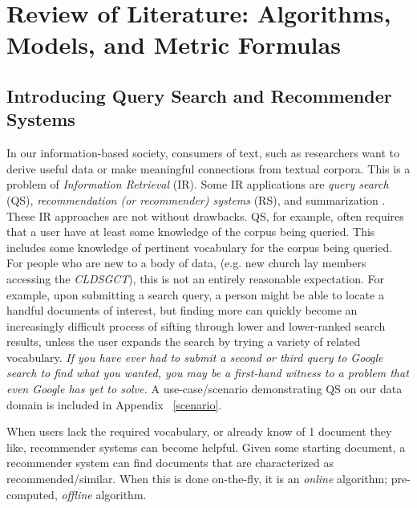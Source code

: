 \chapter{Review of Literature: Algorithms, Models, and Metric Formulas} \label{chp:review-of-literature}


\section{Introducing Query Search and Recommender Systems}
In our information-based society, consumers of text, such as researchers want to derive useful data or make meaningful connections from textual corpora. This is a problem of \textit{Information Retrieval} (IR). Some IR applications are \textit{query search} (QS), \textit{recommendation (or recommender) systems} (RS), and summarization \citep{Mani01summarizationevaluation:2001}.
These IR approaches are not without drawbacks. QS, for example, often requires that a user have at least some knowledge of the corpus being queried. This includes some knowledge of pertinent vocabulary for the corpus being queried. For people who are new to a body of data, (e.g. new church lay members accessing the \textit{CLDSGCT}), this is not an entirely reasonable expectation. For example, upon submitting a search query, a person might be able to locate a handful documents of interest, but finding more can quickly become an increasingly difficult process of sifting through lower and lower-ranked search results, unless the user expands the search by trying a variety of related vocabulary. \textit{If you have ever had to submit a second or third query to Google search to find what you wanted, you may be a first-hand witness to a problem that even Google has yet to solve.} A use-case/scenario demonstrating QS on our data domain is included in Appendix ~\ref{scenario}. %

When users lack the required vocabulary, or already know of 1 document they like, recommender systems can become helpful. Given some starting document, a recommender system can find documents that are characterized as recommended/similar. When this is done on-the-fly, it is an \textit{online} algorithm; pre-computed, \textit{offline} algorithm.

